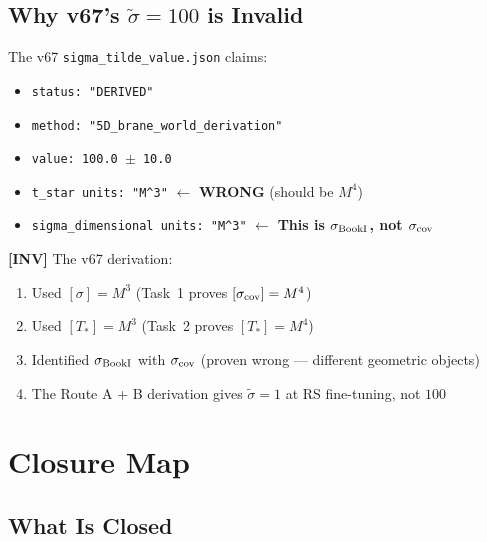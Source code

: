 \documentclass[11pt,a4paper]{article}
\newcommand{\tagINV}{\textcolor{invalidgray}{\textbf{[INV]}}}
\theoremstyle{definition}
\theoremstyle{remark}
\begin{document}
\subsection{Why v67's $\tilde\sigma = 100$ is Invalid}

The v67 \texttt{sigma\_tilde\_value.json} claims:
\begin{itemize}
\item \texttt{status: "DERIVED"}
\item \texttt{method: "5D\_brane\_world\_derivation"}
\item \texttt{value: 100.0 $\pm$ 10.0}
\item \texttt{t\_star units: "M\^{}3"} $\leftarrow$ \textbf{WRONG}
  (should be $M^4$)
\item \texttt{sigma\_dimensional units: "M\^{}3"} $\leftarrow$
  \textbf{This is $\sigma_{\rm BookI}$, not $\sigma_{\rm cov}$}
\end{itemize}

\tagINV{} The v67 derivation:
\begin{enumerate}
\item Used $[\sigma] = M^3$ (Task~1 proves $[\sigma_{\rm cov}] = M^4$)
\item Used $[T_*] = M^3$ (Task~2 proves $[T_*] = M^4$)
\item Identified $\sigma_{\rm BookI}$ with $\sigma_{\rm cov}$ (proven
  wrong --- different geometric objects)
\item The Route A + B derivation gives $\tilde\sigma = 1$ at RS
  fine-tuning, not $100$
\end{enumerate}

\section{Closure Map}
\label{sec:closure}

\subsection{What Is Closed}
\end{document}
